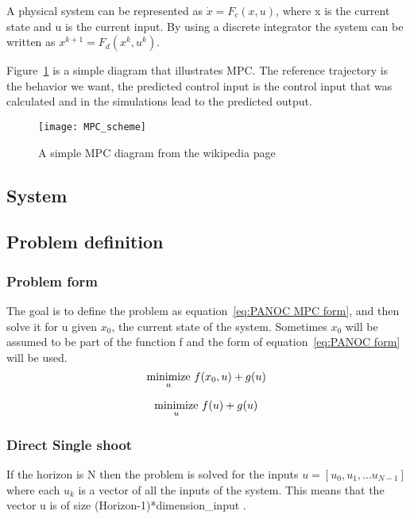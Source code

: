	A physical system can be represented as $\dot{x}=F_c(x,u)$, where x is the current state and u is the current input. By using a discrete integrator the system can be written as $x^{k+1}=F_d(x^{k},u^{k})$. 
	
	Figure~\ref{fig:MPC diagram} is a simple diagram that illustrates MPC. The reference trajectory is the behavior we want, the predicted control input is the control input that was calculated and in the simulations lead to the predicted output.
	
	\begin{figure}[h]
		\centering
		\texttt{[image: MPC\_scheme]}
		\caption{A simple MPC diagram from the wikipedia page}
		\label{fig:MPC diagram}
	\end{figure}
			
	\subsection{System}
		
	\subsection{Problem definition}
		\subsubsection{Problem form}
			The goal is to define the problem as equation~\ref{eq:PANOC MPC form}, and then solve it for u given $x_0$, the current state of the system. Sometimes $x_0$ will be assumed to be part of the function f and the form of equation~\ref{eq:PANOC form} will be used.
			\begin{equation}
				\underset{u}{\operatorname*{minimize}} \  f(x_0,u) + g(u)
				\label{eq:PANOC MPC form}
			\end{equation}
			
			\begin{equation}
				\underset{u}{\operatorname*{minimize}} \  f(u) + g(u)
				\label{eq:PANOC form}
			\end{equation}
		\subsubsection{Direct Single shoot}
			If the horizon is N then the problem is solved for the inputs $u=[u_0,u_1,... u_{N-1}]$ where each $u_k$ is a vector of all the inputs of the system. This means that the vector u is of size (Horizon-1)*dimension\_input .
			
